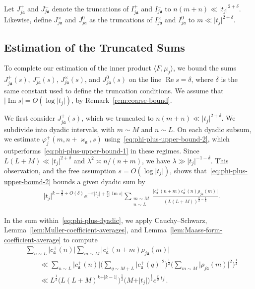 \documentclass[11pt,reqno]{amsart}
\theoremstyle{plain}
\theoremstyle{definition}
\numberwithin{equation}{section}
\renewcommand{\Im}{\operatorname{Im}}
\renewcommand{\Re}{\operatorname{Re}}
\begin{document}
Let $J_{j\mathfrak{a}}^+$ and $J_{j\mathfrak{a}}^-$ denote the truncations of $I_{j\mathfrak{a}}^+$ and $I_{j\mathfrak{a}}^-$ to $n(m+n) \ll \vert t_j \vert^{2+\delta}$. Likewise, define $J_{j\mathfrak{a}}^\times$ and $J_{j\mathfrak{a}}^0$ as the truncations of $I_{j\mathfrak{a}}^\times$ and $I_{j\mathfrak{a}}^0$ to $m \ll \vert t_j \vert^{2+\delta}$.

\subsection{Estimation of the Truncated Sums}

To complete our estimation of the inner product $\langle F, \mu_j \rangle$, we bound the sums $J_{j \mathfrak{a}}^+(s)$, $J_{j \mathfrak{a}}^-(s)$, $J_{j \mathfrak{a}}^\times(s)$, and $J_{j \mathfrak{a}}^0(s)$ on the line $\Re s =\delta$, where $\delta$ is the same constant used to define the truncation conditions. We assume that $\vert \Im s \vert = O(\log \vert t_j \vert)$, by Remark~\ref{rem:coarse-bound}.

We first consider $J_{j \mathfrak{a}}^+(s)$, which we truncated to $n(m+n) \ll \vert t_j \vert^{2+\delta}$. We subdivide into dyadic intervals, with $m \sim M$ and $n \sim L$. On each dyadic subsum, we estimate $\varphi_j^+(m,n+\varkappa_\mathfrak{a},s)$ using~\eqref{eq:phi-plus-upper-bound-2}, which outperforms~\eqref{eq:phi-plus-upper-bound-1} in these regimes.
Since $L(L+M) \ll \vert t_j \vert^{2+\delta}$ and $\lambda^2 \asymp n/(n+m)$, we have $\lambda \gg \vert t_j \vert^{-1-\delta}$. This observation, and the free assumption $s = O(\log \vert t_j \vert)$, shows that~\eqref{eq:phi-plus-upper-bound-2} bounds a given dyadic sum by
\begin{align} \label{eq:phi-plus-dyadic}
	& \vert t_j \vert^{k - \frac{3}{2} + O(\delta)}
	e^{-\pi \vert  t_j \vert + \frac{\pi}{2} \vert \Im s \vert} 
	\sum_{\substack{m \sim M \\ n \sim L}} 
		\frac{\vert c_\mathfrak{a}^+(n+m) c_\mathfrak{a}^+(n) \rho_{j\mathfrak{a}}(m) \vert}
			{(L(L+M))^{\frac{k}{2}-\frac{1}{4}}}.
\end{align}

In the sum within~\eqref{eq:phi-plus-dyadic}, we apply Cauchy--Schwarz, Lemma~\ref{lem:Muller-coefficient-averages}, and Lemma~\ref{lem:Maass-form-coefficient-average} to compute
\begin{align}
	& \sum_{n \sim L} \vert c_\mathfrak{a}^+(n) \vert 
			\sum_{m \sim M} \vert c_\mathfrak{a}^+(n+m) \rho_{j \mathfrak{a}}(m) \vert \\
	&\qquad
	\ll \sum_{n \sim L} \vert c_\mathfrak{a}^+(n) \vert
		\Big(\sum_{q \sim M+L} \vert c_\mathfrak{a}^+(q) \vert^2 \Big)^{\frac{1}{2}}
		\Big(\sum_{m \sim M} \vert \rho_{j\mathfrak{a}}(m) \vert^2 \Big)^{\frac{1}{2}} \\
	&\qquad
	\ll L^{\frac{1}{2}} \big(L(L+M)^{k+ \vert k-1 \vert} \big)^{\frac{1}{2}}
		\big(M+\vert t_j \vert \big)^{\frac{1}{2}} e^{\frac{\pi}{2} \vert t_j \vert}.
\end{align}
\end{document}
